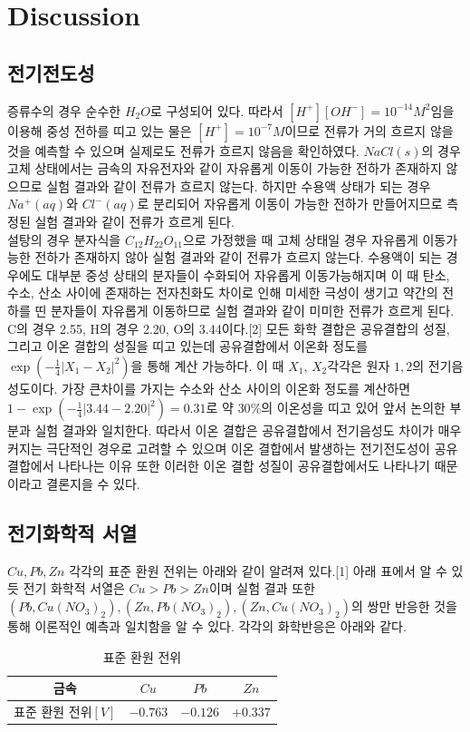 \documentclass[%
 reprint,
 amsmath,amssymb,
 aps,
]{revtex4-2}
\begin{document}
\section{\label{sec:level1}Discussion}
\subsection{\label{sec:level2}전기전도성}
증류수의 경우 순수한 $H_{2}O$로 구성되어 있다. 따라서 $[H^{+}][OH^{-}] = 10^{-14} M^{2}$임을 이용해 중성 전하를 띠고 있는 물은 $[H^{+}] = 10^{-7}M$이므로 전류가 거의 흐르지 않을 것을 예측할 수 있으며 실제로도 전류가 흐르지 않음을 확인하였다. $NaCl(s)$의 경우 고체 상태에서는 금속의 자유전자와 같이 자유롭게 이동이 가능한 전하가 존재하지 않으므로 실험 결과와 같이 전류가 흐르지 않는다. 하지만 수용액 상태가 되는 경우 $Na^{+}(aq)$와 $Cl^{-}(aq)$로 분리되어 자유롭게 이동이 가능한 전하가 만들어지므로 측정된 실험 결과와 같이 전류가 흐르게 된다. \\


설탕의 경우 분자식을 $C_{12}H_{22}O_{11}$으로 가정했을 때 고체 상태일 경우 자유롭게 이동가능한 전하가 존재하지 않아 실험 결과와 같이 전류가 흐르지 않는다. 수용액이 되는 경우에도 대부분 중성 상태의 분자들이 수화되어 자유롭게 이동가능해지며 이 때 탄소, 수소, 산소 사이에 존재하는 전자친화도 차이로 인해 미세한 극성이 생기고 약간의 전하를 띤 분자들이 자유롭게 이동하므로 실험 결과와 같이 미미한 전류가 흐르게 된다. C의 경우 2.55, H의 경우 2.20, O의 3.44이다.[2]  모든 화학 결합은 공유결합의 성질, 그리고 이온 결합의 성질을 띠고 있는데 공유결합에서 이온화 정도를 $\exp\left(-\frac{1}{4}|X_{1}-X_{2}|^{2}\right)$을 통해 계산 가능하다. 이 때 $X_{1}$, $X_{2}$각각은 원자 $1,2$의 전기음성도이다. 가장 큰차이를 가지는 수소와 산소 사이의 이온화 정도를 계산하면 $1-\exp\left(-\frac{1}{4}|3.44-2.20|^{2}\right) = 0.31$로 약 $30\%$의 이온성을 띠고 있어 앞서 논의한 부분과 실험 결과와 일치한다. 따라서 이온 결합은 공유결합에서 전기음성도 차이가 매우 커지는 극단적인 경우로 고려할 수 있으며 이온 결합에서 발생하는 전기전도성이 공유결합에서 나타나는 이유 또한 이러한 이온 결합 성질이 공유결합에서도 나타나기 때문이라고 결론지을 수 있다. 

\subsection{\label{sec:level2}전기화학적 서열}
$Cu, Pb, Zn$ 각각의 표준 환원 전위는 아래와 같이 알려져 있다.[1] 아래 표에서 알 수 있듯 전기 화학적 서열은 $Cu > Pb > Zn$이며 실험 결과 또한 $(Pb,Cu(NO_{3})_{2}), (Zn, Pb(NO_{3})_{2}), (Zn,Cu(NO_{3})_{2})$의 쌍만 반응한 것을 통해 이론적인 예측과 일치함을 알 수 있다. 각각의 화학반응은 아래와 같다.
\begin{table}[]
\begin{tabular}{c|c|c|c} \hline \hline
 금속 & $Cu$ & $Pb$ & $Zn$ \\ \hline
표준 환원 전위$[V]$ & $ -0.763$ & $-0.126$ & $+0.337$ \\  \hline \hline 
\end{tabular}
\caption{\label{tab:STDV}표준 환원 전위}
\end{table}
\end{document}
